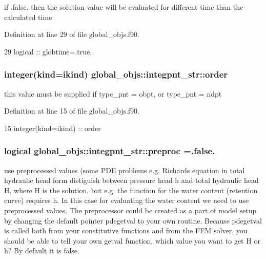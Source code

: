 if .false. then the solution value will be evaluated for different time than the calculated time 



Definition at line 29 of file global\+\_\+objs.\+f90.


\begin{DoxyCode}
29     \textcolor{keywordtype}{logical} :: globtime=.true.
\end{DoxyCode}
\subsubsection[{order}]{\setlength{\rightskip}{0pt plus 5cm}integer(kind=ikind) global\+\_\+objs\+::integpnt\+\_\+str\+::order}\label{structglobal__objs_1_1integpnt__str_aebadd5c47e71ed88fe7fdff2a18eba7d}


this value must be supplied if type\+\_\+pnt = obpt, or type\+\_\+pnt = ndpt 



Definition at line 15 of file global\+\_\+objs.\+f90.


\begin{DoxyCode}
15     \textcolor{keywordtype}{integer(kind=ikind)} :: order
\end{DoxyCode}
\subsubsection[{preproc}]{\setlength{\rightskip}{0pt plus 5cm}logical global\+\_\+objs\+::integpnt\+\_\+str\+::preproc =.false.}\label{structglobal__objs_1_1integpnt__str_aeba4de9fe28cca0e30b636717ae60418}


use preprocessed values (some P\+DE problems e.\+g. Richards equation in total hydraulic head form distiguish between pressure head h and total hydraulic head H, where H is the solution, but e.\+g. the function for the water content (retention curve) requires h. In this case for evaluating the water content we need to use preprocessed values. The preprocessor could be created as a part of model setup by changing the default pointer pdegetval to your own routine. Because pdegetval is called both from your constitutive functions and from the F\+EM solver, you should be able to tell your own getval function, which value you want to get H or h? By default it is false. 



